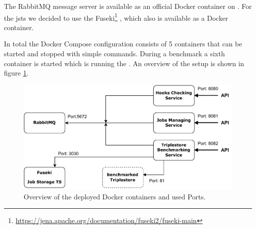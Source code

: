 The RabbitMQ message server is available as an official Docker container on \dockh{}.
For the \ac{jsts} we decided to use the Fuseki\footnote{\url{https://jena.apache.org/documentation/fuseki2/fuseki-main}} \ts{}, which also is available as a Docker container.

In total the Docker Compose configuration consists of 5 containers that can be started and stopped with simple commands.
During a benchmark a sixth container is started which is running the \ts{}.
An overview of the setup is shown in figure \ref{fig:docker-setup}. 

\begin{figure}[tbph]
	\centering
	\includegraphics[width=.7\textwidth]{figures/docker-setup.pdf}
	\caption{Overview of the deployed Docker containers and used Ports.}
	\label{fig:docker-setup}
\end{figure}
